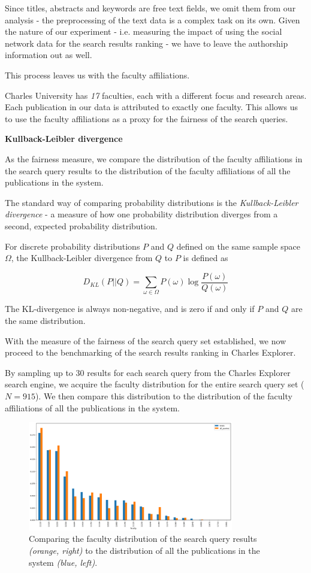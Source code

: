 Since titles, abstracts and keywords are free text fields, we omit them from our analysis - the preprocessing of the text data is a complex task on its own.
Given the nature of our experiment - i.e. measuring the impact of using the social network data for the search results ranking - we have to leave the authorship information out as well.

This process leaves us with the faculty affiliations.

Charles University has \textit{17} faculties, each with a different focus and research areas.
Each publication in our data is attributed to exactly one faculty.
This allows us to use the faculty affiliations as a proxy for the fairness of the search queries.

\textbf{Kullback-Leibler divergence}

As the fairness measure, we compare the distribution of the faculty affiliations in the search query results 
to the distribution of the faculty affiliations of all the publications in the system.

The standard way of comparing probability distributions is the \textit{Kullback-Leibler divergence} - a measure of how one probability distribution diverges from a second, expected probability distribution.

For discrete probability distributions $P$ and $Q$ defined on the same sample space $\Omega$, the Kullback-Leibler divergence from $Q$ to $P$ is defined as

$$
D_{KL}(P||Q) = \sum_{\omega \in \Omega} P(\omega) \log \frac{P(\omega)}{Q(\omega)}
$$

The KL-divergence is always non-negative, and is zero if and only if $P$ and $Q$ are the same distribution.

With the measure of the fairness of the search query set established, we now proceed to the benchmarking of the search results ranking in Charles Explorer.

By sampling up to 30 results for each search query from the Charles Explorer search engine, we acquire the faculty distribution for the entire search query set ($N = 915$).
We then compare this distribution to the distribution of the faculty affiliations of all the publications in the system.

\begin{figure}[ht!]
    \captionsetup{width=.9\linewidth}
    \includegraphics[width=0.8\textwidth]{../img/all-queries-vs-totals.png}
    \centering
    \caption{Comparing the faculty distribution of the search query results \textit{(orange, right)} to the distribution of all the publications in the system \textit{(blue, left)}.}
\end{figure}

